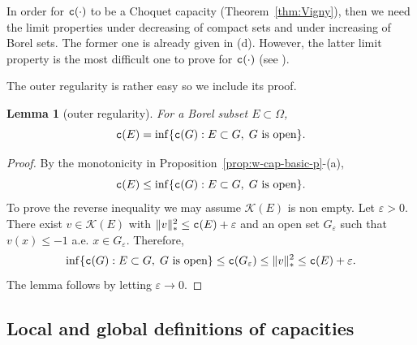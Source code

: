 \documentclass{amsart}
\newcommand{\veps}{\varepsilon}
\newcommand{\tc}{{\tt c}}
\newcommand{\Om}{\Omega}
\newcommand{\cali}[1]{\mathscr{#1}}
\newcommand{\Kc}{\cali{K}}
\newtheorem{lem}[thm]{Lemma}
\theoremstyle{definition}
\numberwithin{thm}{section}
\numberwithin{equation}{section}
\renewcommand{\[}{\begin{equation}}
\renewcommand{\]}{\end{equation}}
\begin{document}
In order for $\tc(\cdot)$ to be a Choquet capacity (Theorem~\ref{thm:Vigny}), then we need the limit properties under decreasing of compact sets and under increasing of Borel sets. The former one is already given in (d).  However, the latter limit property is the most difficult one to prove for $\tc(\cdot)$ (see \cite[Theorem~30]{Vigny}).

The outer regularity is rather easy so we include its proof.
\begin{lem}[outer regularity] \label{lem:outer-reg} For a Borel subset $E\subset \Om$,
\[\notag	\tc(E) = \inf\{ \tc(G) : E \subset G,\; G \text{ is open}\}.
\]
\end{lem}

\begin{proof} By the monotonicity in Proposition~\ref{prop:w-cap-basic-p}-(a), 
$$
	\tc(E) \leq \inf\{ \tc(G) : E \subset G,\; G \text{ is open}\}.
$$
To prove the reverse inequality we may assume $\Kc(E)$ is non empty. Let $\veps>0$. There exist $v\in \Kc(E)$ with 
$
	\|v\|_*^2 \leq \tc(E) +\veps
$
and  an open set $G_\veps$ such that $v(x)\leq - 1$ a.e. $x\in G_\veps$. Therefore, 
$$
	\inf\{ \tc(G) : E \subset G,\; G \text{ is open}\} \leq \tc(G_\veps) \leq \|v\|_*^2 \leq \tc(E) +\veps.
$$
The lemma follows by letting $\veps\to 0$.
\end{proof}


\subsection{Local and global definitions of capacities} 
\end{document}
